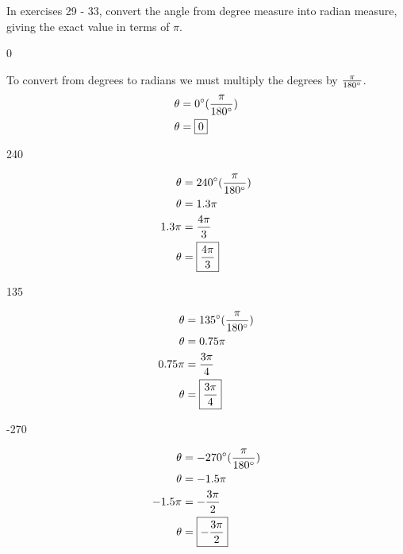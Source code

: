 \documentclass[10pt,letterpaper]{amspset}
\begin{document}
\pagebreak
In exercises 29 - 33, convert the angle from degree measure into radian measure, giving the exact value in terms of $\pi$. 

\begin{problem} [29.]
0\degree
\end{problem}

\begin{solution}
To convert from degrees to radians we must multiply the degrees by $\frac{\pi}{180\degree}$.
\begin{align}
    \theta &= 0\degree (\frac{\pi}{180\degree}) \\
    \theta &= \boxed{0}
\end{align}
\end{solution}


\begin{problem} [30.]
240\degree
\end{problem}

\begin{solution}
\begin{align}
    \theta &= 240\degree (\frac{\pi}{180\degree}) \\
    \theta &= 1.3\pi \\
    1.3\pi &= \frac{4\pi}{3} \\
    \theta &= \boxed{\frac{4\pi}{3}}
\end{align}
\end{solution}


\begin{problem} [31.]
135\degree
\end{problem}

\begin{solution}
\begin{align}
    \theta &= 135\degree (\frac{\pi}{180\degree}) \\
    \theta &= 0.75\pi \\
    0.75\pi &= \frac{3\pi}{4} \\
    \theta &= \boxed{\frac{3\pi}{4}}
\end{align}
\end{solution}


\begin{problem} [32.]
-270\degree
\end{problem}

\begin{solution}
\begin{align}
    \theta &= -270\degree (\frac{\pi}{180\degree}) \\
    \theta &= -1.5\pi \\
    -1.5\pi &= -\frac{3\pi}{2} \\
    \theta &= \boxed{-\frac{3\pi}{2}}
\end{align}
\end{solution}
\end{document}

